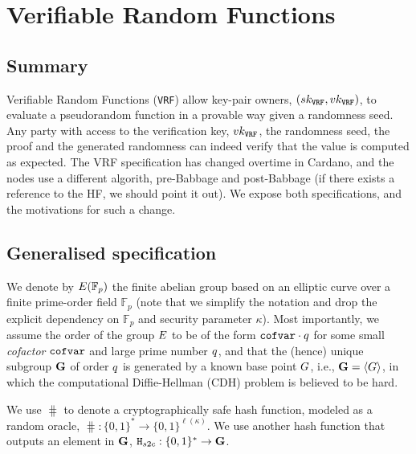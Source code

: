 \section{Verifiable Random Functions}
\subsection{Summary}
\newcommand{\sk}{sk}
\newcommand{\vrf}{\texttt{VRF}\xspace}
\newcommand{\vrfsk}{\sk_{\vrf}}
\newcommand{\vrfvk}{\vk_{\vrf}}
\newcommand{\vrfoutput}{\beta}
\newcommand{\vrfproof}{\Pi}
\newcommand{\vrfkeygen}{\texttt{VrfKeyGen}}
\newcommand{\vrfgenerateproof}{\texttt{GenerateProof}}
\newcommand{\parallelsep}{\;||\;}
\newcommand{\true}{\texttt{true}}
\newcommand{\false}{\texttt{false}}


Verifiable Random Functions (\vrf) allow key-pair owners, $(\vrfsk, \vrfvk)$,
to evaluate a pseudorandom function in a provable way given a randomness seed.
Any party with access to the verification key, $\vrfvk$, the
randomness seed, the proof and the generated randomness can indeed verify
that the value is computed as expected. The VRF specification has changed
overtime in Cardano, and the nodes use a different algorith, pre-Babbage and
post-Babbage (if there exists a reference to the HF, we should point it out).
We expose both specifications, and the motivations for such a change.
\subsection{Generalised specification}
We denote by $E(\mathbb{F}_p)$ the finite abelian group based on an elliptic curve over a finite prime-order field $\mathbb{F}_p$ (note that we simplify the notation and drop the explicit dependency on $\mathbb{F}_p$ and security parameter $\kappa$). Most importantly, we assume the order of the group $E$ to be of the form $\texttt{cofvar}\cdot q$ for some small \emph{cofactor} $\texttt{cofvar}$ and large prime number $q$, and that the (hence) unique subgroup $\mathbf{G}$ of order $q$ is generated by a known base point $G$, i.e., $\mathbf{G} = \langle G\rangle$,  in which the computational Diffie-Hellman (CDH) problem is believed to be hard.

We use $\hash$ to denote a cryptographically safe hash function, modeled as a random oracle, $\hash: \{0,1\}^*\rightarrow\{0,1\}^{\ell(\kappa)}$. We use another hash function that outputs an element in $\mathbf{G}$, $\texttt{H}_{s2c}: \{0,1\}^* \to \mathbf{G}$.

